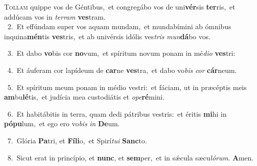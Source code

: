 \lettrine{\initial\textcolor{\initialcolor}{T}}{ollam} quippe vos de Géntibus,~\dagger et congregábo vos de uni\-\textbf{vér}\-sis \textbf{ter}\-ris,~\star et addúcam vos in \textit{ter}\-\textit{ram} \textbf{ves}\-tram.\\
{\numbfont\textcolor{\numbcolor}{~2.}}~Et effúndam super vos aquam mundam,~\dagger et mundabímini ab ómnibus inquina\-\textbf{mén}\-tis \textbf{ves}\-tris,~\star et ab univérsis idólis ves\textit{tris} \textit{mun}\-\textbf{dá}bo vos.\par
{\numbfont\textcolor{\numbcolor}{~3.}}~Et dabo \textbf{vo}\-bis cor \textbf{no}\-vum,~\star et spíritum novum ponam in mé\-\textit{di}\-\textit{o} \textbf{ves}\-tri:\par
{\numbfont\textcolor{\numbcolor}{~4.}}~Et áuferam cor lapídeum de \textbf{car}\-ne \textbf{ves}\-tra,~\star et dabo vo\textit{bis} \textit{cor} \textbf{cár}\-neum.\par
{\numbfont\textcolor{\numbcolor}{~5.}}~Et spíritum meum ponam in médio vestri:~\dagger et fáciam, ut in præcéptis meis \textbf{am}\-bu\-\textbf{lé}\-tis,~\star et judícia mea custodiátis et \textit{o}\-\textit{pe}\textbf{ré}mini.\par
{\numbfont\textcolor{\numbcolor}{~6.}}~Et habitábitis in terra, quam dedi pátribus vestris:~\dagger et éritis \textbf{mi}\-hi in \textbf{pó}\-\textbf{pu}lum,~\star et ego ero vo\textit{bis} \textit{in} \textbf{De}\-um.\par
{\numbfont\textcolor{\numbcolor}{~7.}}~Glória \textbf{Pa}\-tri, et \textbf{Fí}\-\textbf{li}o,~\star et Spirí\-\textit{tu}\-\textit{i} \textbf{Sanc}\-to.\par
{\numbfont\textcolor{\numbcolor}{~8.}}~Sicut erat in princípio, et \textbf{nunc}\-, et \textbf{sem}\-per,~\star et in sǽcula sæcu\-\textit{ló}\-\textit{rum}. \textbf{A}\-men.\par
